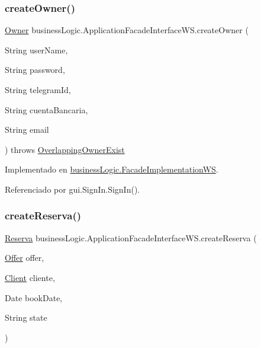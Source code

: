 \subsubsection{\texorpdfstring{createOwner()}{createOwner()}}
{\footnotesize\ttfamily \mbox{\hyperlink{classdomain_1_1_owner}{Owner}} business\+Logic.\+Application\+Facade\+Interface\+W\+S.\+create\+Owner (\begin{DoxyParamCaption}\item[{String}]{user\+Name,  }\item[{String}]{password,  }\item[{String}]{telegram\+Id,  }\item[{String}]{cuenta\+Bancaria,  }\item[{String}]{email }\end{DoxyParamCaption}) throws \mbox{\hyperlink{classexceptions_1_1_overlapping_owner_exist}{Overlapping\+Owner\+Exist}}}



Implementado en \mbox{\hyperlink{classbusiness_logic_1_1_facade_implementation_w_s_ad7a2f26be66f4ae4cbc2a4ad89e74e53}{business\+Logic.\+Facade\+Implementation\+WS}}.



Referenciado por gui.\+Sign\+In.\+Sign\+In().

\mbox{\label{interfacebusiness_logic_1_1_application_facade_interface_w_s_ad807cbd5d877e941edc274563e5cefa3}} 
\subsubsection{\texorpdfstring{createReserva()}{createReserva()}}
{\footnotesize\ttfamily \mbox{\hyperlink{classdomain_1_1_reserva}{Reserva}} business\+Logic.\+Application\+Facade\+Interface\+W\+S.\+create\+Reserva (\begin{DoxyParamCaption}\item[{\mbox{\hyperlink{classdomain_1_1_offer}{Offer}}}]{offer,  }\item[{\mbox{\hyperlink{classdomain_1_1_client}{Client}}}]{cliente,  }\item[{Date}]{book\+Date,  }\item[{String}]{state }\end{DoxyParamCaption})}



